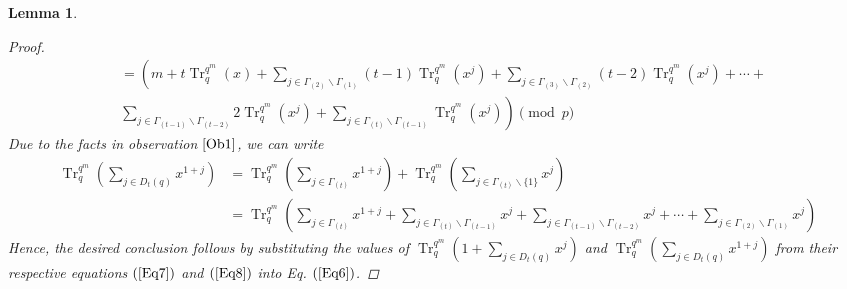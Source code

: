\documentclass[pdflatex,sn-mathphys-num]{sn-jnl}%
\newtheorem{lemma}{Lemma}
\theoremstyle{thmstyleone}%
\theoremstyle{thmstyletwo}%
\theoremstyle{thmstylethree}%
\begin{document}
\begin{lemma}
\begin{proof}
\begin{align}
       &= \left( m+t\operatorname{Tr}_{q}^{q^m}(x)+\sum_{j\in\Gamma_{(2)}\backslash\Gamma_{(1)}}(t-1)\operatorname{Tr}_{q}^{q^m}(x^j)+\sum_{j\in\Gamma_{(3)}\backslash\Gamma_{(2)}}(t-2)\operatorname{Tr}_{q}^{q^m}(x^j)+\cdots\right.+ \nonumber \\ &\left. \sum_{j\in\Gamma_{(t-1)}\backslash\Gamma_{(t-2)}}2\operatorname{Tr}_{q}^{q^m}(x^j)+\sum_{j\in\Gamma_{(t)}\backslash\Gamma_{(t-1)}}\operatorname{Tr}_{q}^{q^m}(x^j) \right) \pmod{p}
   \end{align}
   Due to the facts in observation $\ref{Ob1}$, we can write
   \begin{align}\label{Eq8}
      \operatorname{Tr}_{q}^{q^m}\left(\sum_{j\in D_{t}(q)}x^{1+j}\right) &= \operatorname{Tr}_{q}^{q^m}\left(\sum_{j\in\Gamma_{(t)}}x^{1+j}\right)+ \operatorname{Tr}_{q}^{q^m}\left(\sum_{j\in \Gamma_{(t)}\backslash\{1\}}x^{j}\right) \nonumber \\
      &= \operatorname{Tr}_{q}^{q^m}\left(\sum_{j\in\Gamma_{(t)}}x^{1+j}+\sum_{j\in \Gamma_{(t)}\backslash\Gamma_{(t-1)}}x^{j}+\sum_{j\in \Gamma_{(t-1)}\backslash\Gamma_{(t-2)}}x^{j}+\cdots+\sum_{j\in \Gamma_{(2)}\backslash\Gamma_{(1)}}x^{j}\right)
   \end{align}
   Hence, the desired conclusion follows by substituting the values of $\operatorname{Tr}_{q}^{q^m}\left(1+\sum_{j\in D_{t}(q)}x^j\right)$ and $\operatorname{Tr}_{q}^{q^m}\left(\sum_{j\in D_{t}(q)}x^{1+j}\right)$ from their respective equations $(\ref{Eq7})$ and $(\ref{Eq8})$ into Eq. $(\ref{Eq6})$. 
   \end{proof}
\end{lemma}
\end{document}
